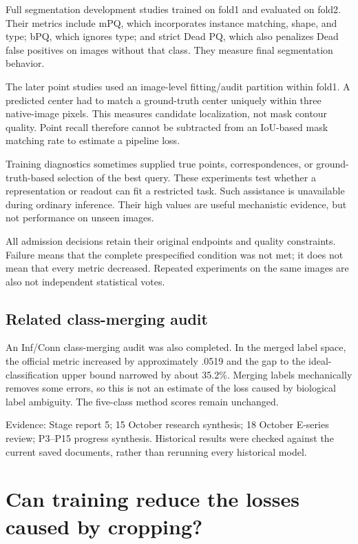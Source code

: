 \documentclass[11pt,a4paper]{article}
\newcommand{\src}[1]{\par{\footnotesize\color{gray}Evidence: #1}\par}
\begin{document}
Full segmentation development studies trained on fold1 and evaluated on fold2. Their metrics include mPQ, which incorporates instance matching, shape, and type; bPQ, which ignores type; and strict Dead PQ, which also penalizes Dead false positives on images without that class. They measure final segmentation behavior.

The later point studies used an image-level fitting/audit partition within fold1. A predicted center had to match a ground-truth center uniquely within three native-image pixels. This measures candidate localization, not mask contour quality. Point recall therefore cannot be subtracted from an IoU-based mask matching rate to estimate a pipeline loss.

Training diagnostics sometimes supplied true points, correspondences, or ground-truth-based selection of the best query. These experiments test whether a representation or readout can fit a restricted task. Such assistance is unavailable during ordinary inference. Their high values are useful mechanistic evidence, but not performance on unseen images.

All admission decisions retain their original endpoints and quality constraints. Failure means that the complete prespecified condition was not met; it does not mean that every metric decreased. Repeated experiments on the same images are also not independent statistical votes.

\subsection{Related class-merging audit}

An Inf/Conn class-merging audit was also completed. In the merged label space, the official metric increased by approximately .0519 and the gap to the ideal-classification upper bound narrowed by about 35.2\%. Merging labels mechanically removes some errors, so this is not an estimate of the loss caused by biological label ambiguity. The five-class method scores remain unchanged.

\src{Stage report 5; 15 October research synthesis; 18 October E-series review; P3--P15 progress synthesis. Historical results were checked against the current saved documents, rather than rerunning every historical model.}

\section{Can training reduce the losses caused by cropping?}
\end{document}
